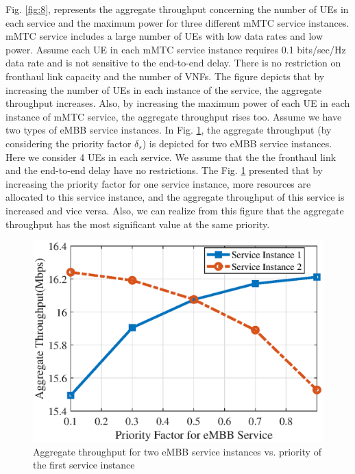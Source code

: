 \documentclass[lettersize,journal]{IEEEtran}
\begin{document}
Fig. \ref{fig:8}, represents the aggregate throughput concerning the number of UEs in each service and the maximum power for three different mMTC service instances. mMTC service includes a large number of UEs with low data rates and low power.
Assume each UE in each mMTC service instance requires 0.1 bits/sec/Hz data rate and is not sensitive to the end-to-end delay. There is no restriction on fronthaul link capacity and the number of VNFs.
The figure depicts that by increasing the number of UEs in each instance of the service, the aggregate throughput increases.
Also, by increasing the maximum power of each UE in each instance of mMTC service, the aggregate throughput rises too.
Assume we have two types of eMBB service instances. In Fig. \ref{fig:9}, the aggregate throughput (by considering the priority factor $\delta_s$) is depicted for two eMBB service instances. Here we consider 4 UEs in each service. We assume that the the fronthaul link and the end-to-end delay have no restrictions.
The Fig. \ref{fig:9} presented that by increasing the priority factor for one service instance, more resources are allocated to this service instance, and the aggregate throughput of this service is increased and vice versa. Also, we can realize from this figure that the aggregate throughput has the most significant value at the same priority.
\begin{figure}%
  \centering
        \includegraphics[scale = 0.5]{fig/priorityLastn.eps}
  \caption{Aggregate throughput for two eMBB service instances vs. priority of the first service instance }
  \label{fig:9}

\end{figure}
\end{document}
